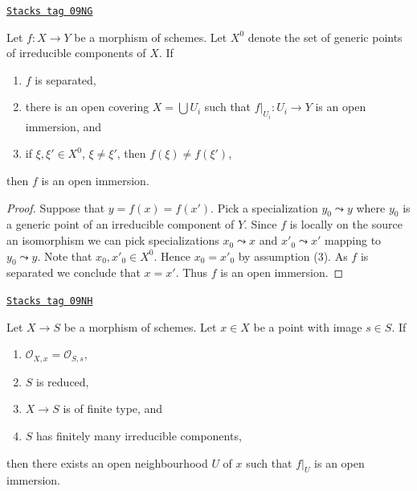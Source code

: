\begin{lemma}
\label{varieties-lemma-characterize-open-immersion}
\href{https://stacks.math.columbia.edu/tag/09NG}{\texttt{Stacks tag 09NG}}

Let $f : X \to Y$ be a morphism of schemes. Let $X^0$ denote the set
of generic points of irreducible components of $X$. If
\begin{enumerate}
\item $f$ is separated,
\item there is an open covering $X = \bigcup U_i$ such that
$f|_{U_i} : U_i \to Y$ is an open immersion, and
\item if $\xi, \xi' \in X^0$, $\xi \not = \xi'$, then $f(\xi) \not = f(\xi')$,
\end{enumerate}
then $f$ is an open immersion.
\end{lemma}

\begin{proof}
Suppose that $y = f(x) = f(x')$. Pick a specialization $y_0 \leadsto y$
where $y_0$ is a generic point of an irreducible component of $Y$.
Since $f$ is locally on the source an isomorphism we can pick specializations
$x_0 \leadsto x$ and $x'_0 \leadsto x'$ mapping to $y_0 \leadsto y$.
Note that $x_0, x'_0 \in X^0$. Hence $x_0 = x'_0$ by assumption (3).
As $f$ is separated we conclude that $x = x'$. Thus $f$ is an open immersion.
\end{proof}

\begin{lemma}
\label{varieties-lemma-local-isomorphism}
\href{https://stacks.math.columbia.edu/tag/09NH}{\texttt{Stacks tag 09NH}}

Let $X \to S$ be a morphism of schemes. Let $x \in X$ be a point with
image $s \in S$. If
\begin{enumerate}
\item $\mathcal{O}_{X, x} = \mathcal{O}_{S, s}$,
\item $S$ is reduced,
\item $X \to S$ is of finite type, and
\item $S$ has finitely many irreducible components,
\end{enumerate}
then there exists an open neighbourhood $U$
of $x$ such that $f|_U$ is an open immersion.
\end{lemma}

